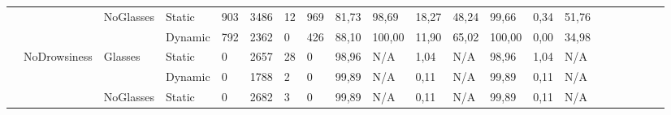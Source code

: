 \documentclass[12pt]{article}
\begin{document}
\begin{landscape}
\begin{table}[]
\begin{adjustbox}{width=1.4\textwidth}
\begin{tabular}{lllllllllllllllccllll}
				\multicolumn{1}{|l|}{} & \multicolumn{1}{l|}{} & \multicolumn{1}{l|}{\multirow{2}{*}{NoGlasses}} & \multicolumn{1}{l|}{Static}  & \multicolumn{1}{l|}{903} & \multicolumn{1}{l|}{3486} & \multicolumn{1}{l|}{12} & \multicolumn{1}{l|}{969} & \multicolumn{1}{l|}{81,73} & \multicolumn{1}{l|}{98,69} & \multicolumn{1}{l|}{18,27} & \multicolumn{1}{l|}{48,24} & \multicolumn{1}{l|}{99,66} & \multicolumn{1}{l|}{0,34} & \multicolumn{1}{l|}{51,76} & \multicolumn{1}{c|}{} & \multicolumn{1}{c|}{} & \multicolumn{1}{l|}{} & \multicolumn{1}{l|}{} & \multicolumn{1}{l|}{} & \multicolumn{1}{l|}{}\\ \cline{4-15}
				\multicolumn{1}{|l|}{} & \multicolumn{1}{l|}{} & \multicolumn{1}{l|}{} & \multicolumn{1}{l|}{Dynamic} & \multicolumn{1}{l|}{792} & \multicolumn{1}{l|}{2362} & \multicolumn{1}{l|}{0} & \multicolumn{1}{l|}{426} & \multicolumn{1}{l|}{88,10} & \multicolumn{1}{l|}{100,00} & \multicolumn{1}{l|}{11,90} & \multicolumn{1}{l|}{65,02} & \multicolumn{1}{l|}{100,00} & \multicolumn{1}{l|}{0,00} & \multicolumn{1}{l|}{34,98} & \multicolumn{1}{c|}{} & \multicolumn{1}{c|}{} & \multicolumn{1}{l|}{} & \multicolumn{1}{l|}{} & \multicolumn{1}{l|}{} & \multicolumn{1}{l|}{} \\ \cline{2-15}
				\multicolumn{1}{|l|}{} & \multicolumn{1}{l|}{\multirow{4}{*}{NoDrowsiness}} & \multicolumn{1}{l|}{\multirow{2}{*}{Glasses}} & \multicolumn{1}{l|}{Static} & \multicolumn{1}{l|}{0} & \multicolumn{1}{l|}{2657} & \multicolumn{1}{l|}{28} & \multicolumn{1}{l|}{0} & \multicolumn{1}{l|}{98,96} & \multicolumn{1}{l|}{N/A} & \multicolumn{1}{l|}{1,04} & \multicolumn{1}{l|}{N/A} & \multicolumn{1}{l|}{98,96} & \multicolumn{1}{l|}{1,04} & \multicolumn{1}{l|}{N/A} & \multicolumn{1}{c|}{} & \multicolumn{1}{c|}{} & \multicolumn{1}{l|}{} & \multicolumn{1}{l|}{} & \multicolumn{1}{l|}{} & \multicolumn{1}{l|}{}\\ \cline{4-15}
				\multicolumn{1}{|l|}{} & \multicolumn{1}{l|}{} & \multicolumn{1}{l|}{} & \multicolumn{1}{l|}{Dynamic} & \multicolumn{1}{l|}{0} & \multicolumn{1}{l|}{1788} & \multicolumn{1}{l|}{2} & \multicolumn{1}{l|}{0} & \multicolumn{1}{l|}{99,89} & \multicolumn{1}{l|}{N/A} & \multicolumn{1}{l|}{0,11} & \multicolumn{1}{l|}{N/A} & \multicolumn{1}{l|}{99,89} & \multicolumn{1}{l|}{0,11} & \multicolumn{1}{l|}{N/A} & \multicolumn{1}{c|}{} & \multicolumn{1}{c|}{} & \multicolumn{1}{l|}{} & \multicolumn{1}{l|}{} & \multicolumn{1}{l|}{} & \multicolumn{1}{l|}{}\\ \cline{3-15}
				\multicolumn{1}{|l|}{} & \multicolumn{1}{l|}{} & \multicolumn{1}{l|}{\multirow{2}{*}{NoGlasses}} & \multicolumn{1}{l|}{Static} & \multicolumn{1}{l|}{0} & \multicolumn{1}{l|}{2682} & \multicolumn{1}{l|}{3} & \multicolumn{1}{l|}{0} & \multicolumn{1}{l|}{99,89} & \multicolumn{1}{l|}{N/A} & \multicolumn{1}{l|}{0,11} & \multicolumn{1}{l|}{N/A} & \multicolumn{1}{l|}{99,89} & \multicolumn{1}{l|}{0,11} & \multicolumn{1}{l|}{N/A} & \multicolumn{1}{c|}{} & \multicolumn{1}{c|}{} & \multicolumn{1}{l|}{} & \multicolumn{1}{l|}{} & \multicolumn{1}{l|}{} & \multicolumn{1}{l|}{} \\ \cline{4-15}

\end{tabular}
\end{adjustbox}
\end{table}
\end{landscape}
\end{document}
